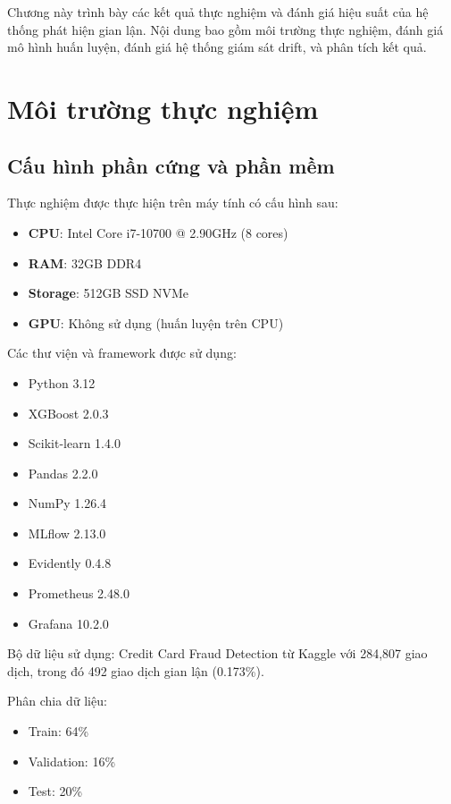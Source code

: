 Chương này trình bày các kết quả thực nghiệm và đánh giá hiệu suất của hệ thống phát hiện gian lận. Nội dung bao gồm môi trường thực nghiệm, đánh giá mô hình huấn luyện, đánh giá hệ thống giám sát drift, và phân tích kết quả.

\section{Môi trường thực nghiệm}

\subsection{Cấu hình phần cứng và phần mềm}

Thực nghiệm được thực hiện trên máy tính có cấu hình sau:
\begin{itemize}
    \item \textbf{CPU}: Intel Core i7-10700 @ 2.90GHz (8 cores)
    \item \textbf{RAM}: 32GB DDR4
    \item \textbf{Storage}: 512GB SSD NVMe
    \item \textbf{GPU}: Không sử dụng (huấn luyện trên CPU)
\end{itemize}

Các thư viện và framework được sử dụng:
\begin{itemize}
    \item Python 3.12
    \item XGBoost 2.0.3
    \item Scikit-learn 1.4.0
    \item Pandas 2.2.0
    \item NumPy 1.26.4
    \item MLflow 2.13.0
    \item Evidently 0.4.8
    \item Prometheus 2.48.0
    \item Grafana 10.2.0
\end{itemize}

Bộ dữ liệu sử dụng: Credit Card Fraud Detection từ Kaggle với 284,807 giao dịch, trong đó 492 giao dịch gian lận (0.173\%).

Phân chia dữ liệu:
\begin{itemize}
    \item Train: 64\%
    \item Validation: 16\%
    \item Test: 20\%
\end{itemize}

